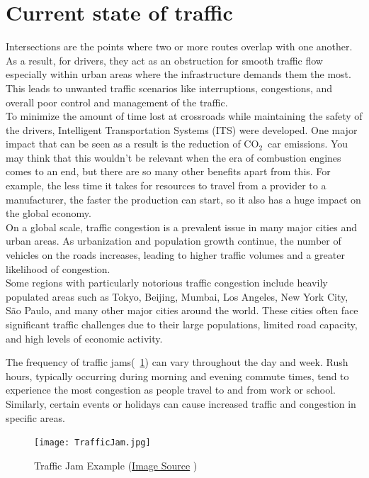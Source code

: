 \documentclass[17pt]{report}
\newcommand{\coo}{\ensuremath{\mathrm{CO_2}}}
\begin{document}
\section{Current state of traffic}
\indent \indent
Intersections are the points where two or more
routes overlap with one another. As a result, for drivers, 
they act as an obstruction for smooth traffic
flow especially within urban areas where the
infrastructure demands them the most. This leads to unwanted 
traffic scenarios like interruptions, congestions, and
overall poor control and management of the traffic.\\
\indent \indent
To minimize the amount of time lost at crossroads while
maintaining the safety of the drivers, Intelligent
Transportation Systems (ITS) were developed.
One major impact that can be seen as a result is the
reduction of \coo\ car emissions. You may think that
this wouldn't be relevant when the era of combustion
engines comes to an end, but there are so many other
benefits apart from this. For example, the less time
it takes for resources to travel from a provider to a
manufacturer, the faster the production can start, so
it also has a huge impact on the global economy.\\
\indent \indent
On a global scale, traffic congestion is a prevalent issue in many
major cities and urban areas. As urbanization and population growth
continue, the number of vehicles on the roads increases, leading to
higher traffic volumes and a greater likelihood of congestion.\\
\indent
Some regions with particularly notorious traffic congestion include
heavily populated areas such as Tokyo, Beijing, Mumbai, Los Angeles,
New York City, São Paulo, and many other major cities around the world.
These cities often face significant traffic challenges due to their large populations, limited road capacity, and high levels of economic activity.

The frequency of traffic jams(~\ref{fig:TrafficJam}) 
can vary throughout the day and week.
Rush hours, typically occurring during morning and evening commute
times, tend to experience the most congestion as people travel to
and from work or school. Similarly, certain events or holidays can
cause increased traffic and congestion in specific areas.

\begin{figure}[h!]
    \texttt{[image: TrafficJam.jpg]}
    \caption{Traffic Jam Example 
    (\href{https://unsplash.com/photos/cekJ1XXx1Rk}{Image Source} \textcopyright)}
    \label{fig:TrafficJam}
\end{figure}
\end{document}
